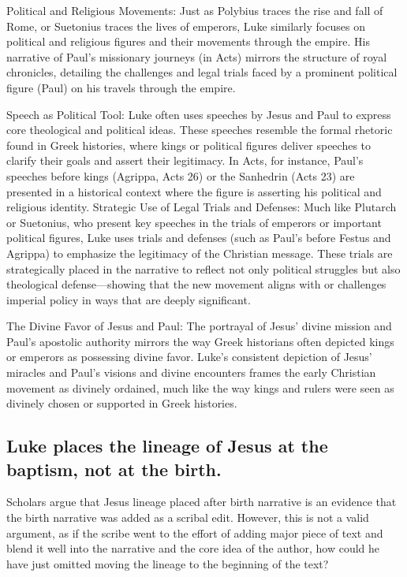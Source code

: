 Political and Religious Movements: Just as Polybius traces the rise and fall of Rome, or Suetonius traces the lives of emperors, Luke similarly focuses on political and religious figures and their movements through the empire.
His narrative of Paul's missionary journeys (in Acts) mirrors the structure of royal chronicles, detailing the challenges and legal trials faced by a prominent political figure (Paul) on his travels through the empire.

Speech as Political Tool: Luke often uses speeches by Jesus and Paul to express core theological and political ideas.
These speeches resemble the formal rhetoric found in Greek histories, where kings or political figures deliver speeches to clarify their goals and assert their legitimacy.
In Acts, for instance, Paul's speeches before kings (Agrippa, Acts 26) or the Sanhedrin (Acts 23) are presented in a historical context where the figure is asserting his political and religious identity.
Strategic Use of Legal Trials and Defenses: Much like Plutarch or Suetonius, who present key speeches in the trials of emperors or important political figures, Luke uses trials and defenses (such as Paul's before Festus and Agrippa) to emphasize the legitimacy of the Christian message.
These trials are strategically placed in the narrative to reflect not only political struggles but also theological defense---showing that the new movement aligns with or challenges imperial policy in ways that are deeply significant.

The Divine Favor of Jesus and Paul: The portrayal of Jesus' divine mission and Paul's apostolic authority mirrors the way Greek historians often depicted kings or emperors as possessing divine favor.
Luke's consistent depiction of Jesus' miracles and Paul's visions and divine encounters frames the early Christian movement as divinely ordained, much like the way kings and rulers were seen as divinely chosen or supported in Greek histories.

\subsection{Luke places the lineage of Jesus at the baptism, not at the birth.}\label{subsec:luke-places-the-lineage-of-jesus-at-the-baptism-not-at-the-birth.}

Scholars argue that Jesus lineage placed after birth narrative is an evidence that the birth narrative was added as a scribal edit.
However, this is not a valid argument, as if the scribe went to the effort of adding major piece of text and blend it well into the narrative and the core idea of the author, how could he have just omitted moving the lineage to the beginning of the text?


